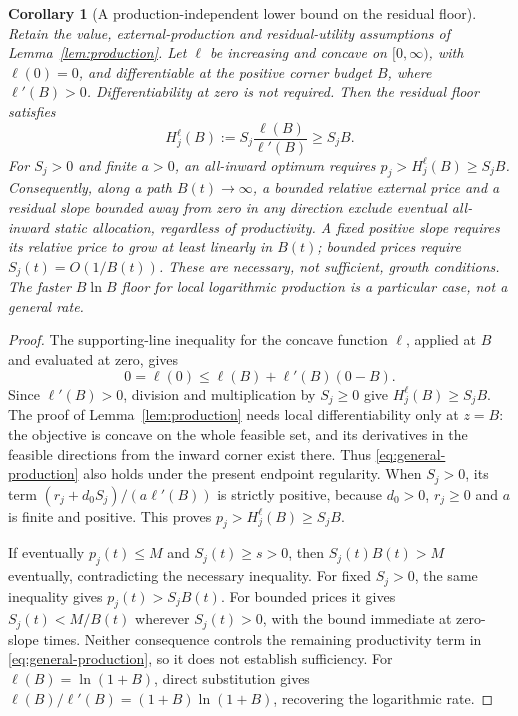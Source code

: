 \documentclass[11pt,a4paper]{article}
\newtheorem{productioncorollary}{Corollary}[proposition]
\theoremstyle{definition}\newtheorem{definition}{Definition}
\begin{document}
\begin{productioncorollary}[A production-independent lower bound on the residual floor]
\label{cor:production-growth}
Retain the value, external-production and residual-utility assumptions of
Lemma~\ref{lem:production}. Let $\ell$ be increasing and concave on
$[0,\infty)$, with $\ell(0)=0$, and differentiable at the positive
corner budget $B$, where $\ell'(B)>0$. Differentiability at zero is
not required. Then the residual floor satisfies
\[
 H_j^{\ell}(B):=S_j\frac{\ell(B)}{\ell'(B)}\geq S_jB.
\]
For $S_j>0$ and finite $a>0$, an all-inward optimum requires
$p_j>H_j^{\ell}(B)\geq S_jB$. Consequently, along a path
$B(t)\to\infty$, a bounded relative external price and a residual slope
bounded away from zero in any direction exclude eventual all-inward
static allocation, regardless of productivity. A fixed positive slope
requires its relative price to grow at least linearly in $B(t)$;
bounded prices require $S_j(t)=O(1/B(t))$. These are necessary,
not sufficient, growth conditions. The faster $B\ln B$ floor for local
logarithmic production is a particular case, not a general rate.
\end{productioncorollary}
\begin{proof}
The supporting-line inequality for the concave function $\ell$, applied
at $B$ and evaluated at zero, gives
\[
 0=\ell(0)\leq\ell(B)+\ell'(B)(0-B).
\]
Since $\ell'(B)>0$, division and multiplication by $S_j\geq0$ give
$H_j^{\ell}(B)\geq S_jB$. The proof of Lemma~\ref{lem:production} needs
local differentiability only at $z=B$: the objective is concave on the
whole feasible set, and its derivatives in the feasible directions from
the inward corner exist there. Thus \cref{eq:general-production} also
holds under the present endpoint regularity. When $S_j>0$, its term
$(r_j+d_0S_j)/(a\ell'(B))$ is strictly positive, because $d_0>0$,
$r_j\geq0$ and $a$ is finite and positive. This proves
$p_j>H_j^{\ell}(B)\geq S_jB$.

If eventually $p_j(t)\leq M$ and $S_j(t)\geq s>0$, then
$S_j(t)B(t)>M$ eventually, contradicting the necessary inequality.
For fixed $S_j>0$, the same inequality gives $p_j(t)>S_jB(t)$.
For bounded prices it gives $S_j(t)<M/B(t)$ wherever $S_j(t)>0$,
with the bound immediate at zero-slope times. Neither consequence
controls the remaining productivity term in
\cref{eq:general-production}, so it does not establish sufficiency.
For $\ell(B)=\ln(1+B)$, direct substitution gives
$\ell(B)/\ell'(B)=(1+B)\ln(1+B)$, recovering the logarithmic rate.
\end{proof}
\end{document}
